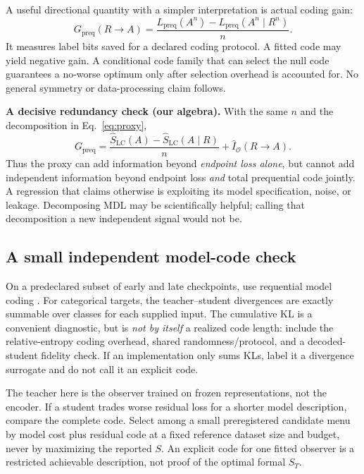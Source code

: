 \documentclass[11pt,a4paper]{article}
\newcommand{\pre}{\mathrm{preq}}
\begin{document}
A useful directional quantity with a simpler interpretation is actual coding gain:
\begin{equation}
G_{\pre}(R\to A)=\frac{L_{\pre}(A^n)-L_{\pre}(A^n\mid R^n)}{n}.
\label{eq:gain}
\end{equation}
It measures label bits saved for a declared coding protocol. A fitted code may yield negative gain. A conditional code family that can select the null code guarantees a no-worse optimum only after selection overhead is accounted for. No general symmetry or data-processing claim follows.

\textbf{A decisive redundancy check (our algebra).} With the same $n$ and the decomposition in Eq.~\eqref{eq:proxy},
\begin{equation}
G_{\pre}=\frac{\widehat S_{\mathrm{LC}}(A)
                   -\widehat S_{\mathrm{LC}}(A\mid R)}{n}
              +\widehat I_{\mathcal O}(R\to A).
\label{eq:redundancy}
\end{equation}
Thus the proxy can add information beyond \emph{endpoint loss alone}, but cannot add independent information beyond endpoint loss \emph{and} total prequential code jointly. A regression that claims otherwise is exploiting its model specification, noise, or leakage. Decomposing MDL may be scientifically helpful; calling that decomposition a new independent signal would not be.

\subsection{A small independent model-code check}
On a predeclared subset of early and late checkpoints, use requential model coding \citep{finzi2026,qiu2026}. For categorical targets, the teacher--student divergences are exactly summable over classes for each supplied input. The cumulative KL is a convenient diagnostic, but is \emph{not by itself} a realized code length: include the relative-entropy coding overhead, shared randomness/protocol, and a decoded-student fidelity check. If an implementation only sums KLs, label it a divergence surrogate and do not call it an explicit code.

The teacher here is the observer trained on frozen representations, not the encoder. If a student trades worse residual loss for a shorter model description, compare the complete code. Select among a small preregistered candidate menu by model cost plus residual code at a fixed reference dataset size and budget, never by maximizing the reported $S$. An explicit code for one fitted observer is a restricted achievable description, not proof of the optimal formal $S_T$.
\end{document}
